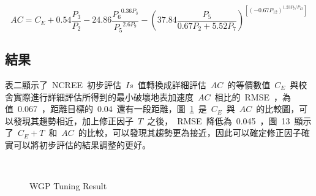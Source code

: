 \begin{equation} AC = C_E + 0.54 \dfrac{P_3}{P_2} - 24.86 \dfrac{ {P_6}^{0.36P_3} }{ {P_5}^{2.6P_9} } - ( 37.84 \dfrac{P_5}{0.67P_2 + 5.52P_7} )^{\left[ (-0.67 P_{12})^{1.23P_7/P_{13}} \right]} \label{eq:WGP_AC_IS}\end{equation}


\subsection{結果}

表二顯示了~NCREE~初步評估~$Is$~值轉換成詳細評估~$AC$~的等價數值~$C_E$~與校舍實際進行詳細評估所得到的最小破壞地表加速度~$AC$~相比的~RMSE~，為值~0.067~，距離目標的~0.04~還有一段距離，圖~\ref{fig:wgp-tuning}~是~$C_E$~與~$AC$~的比較圖，可以發現其趨勢相近，加上修正因子~$T$~之後，~RMSE~降低為~0.045~，圖~13~顯示了~$C_E + T$~和~$AC$~的比較，可以發現其趨勢更為接近，因此可以確定修正因子確實可以將初步評估的結果調整的更好。

\begin{figure}
  \begin{center}
    \\
    \caption{WGP Tuning Result}
    \label{fig:wgp-tuning}
  \end{center}
\end{figure}

